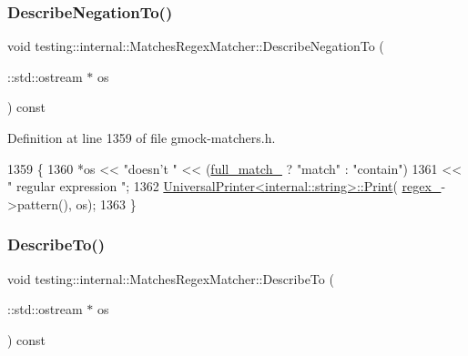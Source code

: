 \subsubsection{\texorpdfstring{Describe\+Negation\+To()}{DescribeNegationTo()}}
{\footnotesize\ttfamily void testing\+::internal\+::\+Matches\+Regex\+Matcher\+::\+Describe\+Negation\+To (\begin{DoxyParamCaption}\item[{\+::std\+::ostream $\ast$}]{os }\end{DoxyParamCaption}) const\hspace{0.3cm}{\ttfamily [inline]}}



Definition at line 1359 of file gmock-\/matchers.\+h.


\begin{DoxyCode}
1359                                                 \{
1360     *os << \textcolor{stringliteral}{"doesn't "} << (\hyperlink{classtesting_1_1internal_1_1MatchesRegexMatcher_ac2690d696a5a1ec134a90c5cc21b2072}{full\_match\_} ? \textcolor{stringliteral}{"match"} : \textcolor{stringliteral}{"contain"})
1361         << \textcolor{stringliteral}{" regular expression "};
1362     \hyperlink{classtesting_1_1internal_1_1UniversalPrinter_aecec021e1abbaa260b701e24e3fe33eb}{UniversalPrinter<internal::string>::Print}(
      \hyperlink{classtesting_1_1internal_1_1MatchesRegexMatcher_a585228fef5cc1158f064aa4f3eaf882e}{regex\_}->pattern(), os);
1363   \}
\end{DoxyCode}
\mbox{\label{classtesting_1_1internal_1_1MatchesRegexMatcher_a8ebd3a0cf33a7bad04a3daf4b0653d8f}} 
\subsubsection{\texorpdfstring{Describe\+To()}{DescribeTo()}}
{\footnotesize\ttfamily void testing\+::internal\+::\+Matches\+Regex\+Matcher\+::\+Describe\+To (\begin{DoxyParamCaption}\item[{\+::std\+::ostream $\ast$}]{os }\end{DoxyParamCaption}) const\hspace{0.3cm}{\ttfamily [inline]}}




